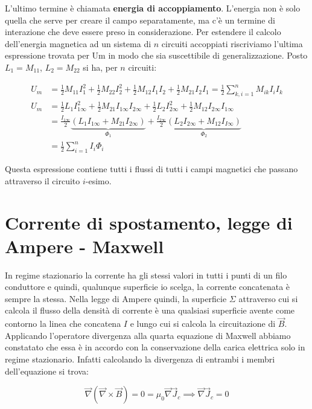 L'ultimo termine è chiamata \textbf{energia di accoppiamento}. L'energia non è solo quella che serve per creare il campo separatamente, ma c'è un termine di interazione che deve essere preso in considerazione.
Per estendere il calcolo dell'energia magnetica ad un sistema di $n$ circuiti accoppiati riscriviamo l'ultima espressione trovata per Um in modo che sia suscettibile di generalizzazione. Posto $L_1=M_{11}$, $L_2=M_{22}$ si ha, per $n$ circuiti:

\begin{align*}
	U_m &= \frac{1}{2} M_{11} I_1^2 + \frac{1}{2} M_{22}I_2^2 + \frac{1}{2} M_{12}I_1I_2 + \frac{1}{2} M_{21}I_2I_1 = \frac{1}{2}  \sum_{k,i=1}^n M_{ik}I_iI_k   \\
	U_m &= \frac{1}{2} L_1I_{1\infty}^2 + \frac{1}{2} M_{21} I_{1\infty}I_{2\infty} + \frac{1}{2} L_2I_{2\infty}^2  + \frac{1}{2}  M_{12}I_{2\infty}I_{1\infty} \\
	&= \frac{I_{1\infty}}{2} \underbrace{(L_1I_{1\infty} +M_{21}I_{2\infty})}_{\Phi_1} +\frac{I_{2\infty}}{2} \underbrace{(L_2I_{2\infty} +M_{12}I_{I\infty})}_{\Phi_2} \\
	&= \frac{1}{2} \sum_{i=1}^n I_i\Phi_i
\end{align*}

Questa espressione contiene tutti i flussi di tutti i campi magnetici che passano attraverso il circuito $i$-esimo.

\section{Corrente di spostamento, legge di Ampere - Maxwell}

In regime stazionario la corrente ha gli stessi valori in tutti i punti di un filo conduttore e quindi, qualunque superficie io scelga, la corrente concatenata è sempre la stessa. Nella legge di Ampere quindi, la superficie $ \Sigma  $ attraverso cui si calcola il flusso della densità di corrente è una qualsiasi superficie avente come contorno la linea che concatena $I$ e lungo cui si calcola la circuitazione di $\vec{B}$. Applicando l'operatore divergenza alla quarta equazione di Maxwell abbiamo constatato che essa è in accordo con la conservazione della carica elettrica solo in regime stazionario. Infatti calcolando la divergenza di entrambi i membri dell'equazione si trova:

\[
	\vec{\nabla} (\vec{\nabla} \times \vec{B}) = 0 = \mu_0 \vec{\nabla} \vec{J}_c \implies \vec{\nabla} \vec{J}_c = 0
\]

